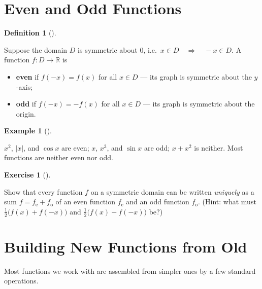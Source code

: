 \documentclass[
  letterpaper,
  DIV=11,
  numbers=noendperiod]{scrreprt}
\providecommand{\tightlist}{%
  \setlength{\itemsep}{0pt}\setlength{\parskip}{0pt}}
\theoremstyle{plain}
\theoremstyle{plain}
\theoremstyle{definition}
\newtheorem{definition}{Definition}[chapter]
\theoremstyle{definition}
\newtheorem{exercise}{Exercise}[chapter]
\theoremstyle{definition}
\newtheorem{example}{Example}[chapter]
\theoremstyle{plain}
\theoremstyle{plain}
\theoremstyle{remark}
\begin{document}
\section{Even and Odd Functions}\label{even-and-odd-functions}

\begin{definition}[]\protect\hypertarget{def-even-odd}{}\label{def-even-odd}

\hfill\break
Suppose the domain \(D\) is symmetric about \(0\),
i.e.~\(x\in D \quad \Rightarrow \quad-x\in D\). A function
\(f\colon D\to\mathbb{R}\) is

\begin{itemize}
\tightlist
\item
  \textbf{even} if \(f(-x)=f(x)\) for all \(x\in D\) --- its graph is
  symmetric about the \(y\)-axis;
\item
  \textbf{odd} if \(f(-x)=-f(x)\) for all \(x\in D\) --- its graph is
  symmetric about the origin.
\end{itemize}

\end{definition}

\begin{example}[]\protect\hypertarget{exm-even-odd}{}\label{exm-even-odd}

\hfill\break
\(x^2\), \(\lvert x \rvert\), and \(\cos x\) are even; \(x\), \(x^3\),
and \(\sin x\) are odd; \(x + x^2\) is neither. Most functions are
neither even nor odd.

\end{example}

\begin{exercise}[]\protect\hypertarget{exr-even-odd-decomposition}{}\label{exr-even-odd-decomposition}

Show that every function \(f\) on a symmetric domain can be written
\emph{uniquely} as a sum \(f = f_{\mathrm e} + f_{\mathrm o}\) of an
even function \(f_{\mathrm e}\) and an odd function \(f_{\mathrm o}\).
(Hint: what must \(\tfrac12\bigl(f(x)+f(-x)\bigr)\) and
\(\tfrac12\bigl(f(x)-f(-x)\bigr)\) be?)

\end{exercise}

\section{Building New Functions from
Old}\label{building-new-functions-from-old}

Most functions we work with are assembled from simpler ones by a few
standard operations.
\end{document}
